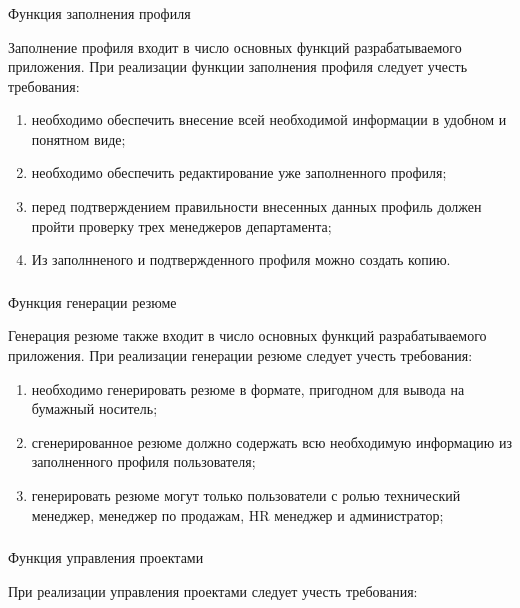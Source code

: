 \subsubsection{} Функция заполнения профиля
\label{sec:domain:specification:profile}

Заполнение профиля входит в число основных функций разрабатываемого приложения. При реализации функции заполнения
профиля следует учесть требования:

\begin{enumerate}
	\item необходимо обеспечить внесение всей необходимой информации в удобном и понятном виде;
	\item необходимо обеспечить редактирование уже заполненного профиля;
  \item перед подтверждением правильности внесенных данных профиль должен пройти проверку трех менеджеров
  департамента;
	\item Из заполнненого и подтвержденного профиля можно создать копию.
\end{enumerate}

\subsubsection{} Функция генерации резюме
\label{sec:domain:specification:resume}

Генерация резюме также входит в число основных функций разрабатываемого приложения. При реализации генерации
резюме следует учесть требования:

\begin{enumerate}
	\item необходимо генерировать резюме в формате, пригодном для вывода на бумажный носитель;
	\item сгенерированное резюме должно содержать всю необходимую информацию из заполненного профиля пользователя;
  \item генерировать резюме могут только пользователи с ролью технический менеджер, менеджер по продажам,
  HR менеджер и администратор;
\end{enumerate}

\subsubsection{} Функция управления проектами
\label{sec:domain:specification:projects}

При реализации управления проектами следует учесть требования:


